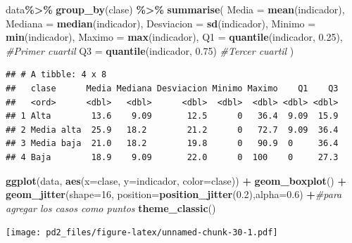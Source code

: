 \documentclass[
]{article}
\newenvironment{Shaded}{\begin{snugshade}}{\end{snugshade}}
\newcommand{\AttributeTok}[1]{\textcolor[rgb]{0.13,0.29,0.53}{#1}}
\newcommand{\CommentTok}[1]{\textcolor[rgb]{0.56,0.35,0.01}{\textit{#1}}}
\newcommand{\DecValTok}[1]{\textcolor[rgb]{0.00,0.00,0.81}{#1}}
\newcommand{\FloatTok}[1]{\textcolor[rgb]{0.00,0.00,0.81}{#1}}
\newcommand{\FunctionTok}[1]{\textcolor[rgb]{0.13,0.29,0.53}{\textbf{#1}}}
\newcommand{\NormalTok}[1]{#1}
\newcommand{\SpecialCharTok}[1]{\textcolor[rgb]{0.81,0.36,0.00}{\textbf{#1}}}
\begin{document}
\begin{Shaded}
\begin{Highlighting}[]
\NormalTok{data}\SpecialCharTok{\%\textgreater{}\%}
  \FunctionTok{group\_by}\NormalTok{(clase) }\SpecialCharTok{\%\textgreater{}\%}
  \FunctionTok{summarise}\NormalTok{(}
    \AttributeTok{Media =} \FunctionTok{mean}\NormalTok{(indicador), }
    \AttributeTok{Mediana =} \FunctionTok{median}\NormalTok{(indicador), }
    \AttributeTok{Desviacion =} \FunctionTok{sd}\NormalTok{(indicador), }
    \AttributeTok{Minimo =} \FunctionTok{min}\NormalTok{(indicador), }
    \AttributeTok{Maximo =} \FunctionTok{max}\NormalTok{(indicador),}
    \AttributeTok{Q1 =} \FunctionTok{quantile}\NormalTok{(indicador, }\FloatTok{0.25}\NormalTok{), }\CommentTok{\#Primer cuartil}
    \AttributeTok{Q3 =} \FunctionTok{quantile}\NormalTok{(indicador, }\FloatTok{0.75}\NormalTok{) }\CommentTok{\#Tercer cuartil}
\NormalTok{  )}
\end{Highlighting}
\end{Shaded}

\begin{verbatim}
## # A tibble: 4 x 8
##   clase      Media Mediana Desviacion Minimo Maximo    Q1    Q3
##   <ord>      <dbl>   <dbl>      <dbl>  <dbl>  <dbl> <dbl> <dbl>
## 1 Alta        13.6    9.09       12.5      0   36.4  9.09  15.9
## 2 Media alta  25.9   18.2        21.2      0   72.7  9.09  36.4
## 3 Media baja  21.0   18.2        19.8      0   90.9  0     36.4
## 4 Baja        18.9    9.09       22.0      0  100    0     27.3
\end{verbatim}

\begin{Shaded}
\begin{Highlighting}[]
\FunctionTok{ggplot}\NormalTok{(data, }\FunctionTok{aes}\NormalTok{(}\AttributeTok{x=}\NormalTok{clase, }\AttributeTok{y=}\NormalTok{indicador, }\AttributeTok{color=}\NormalTok{clase)) }\SpecialCharTok{+} 
  \FunctionTok{geom\_boxplot}\NormalTok{() }\SpecialCharTok{+} 
  \FunctionTok{geom\_jitter}\NormalTok{(}\AttributeTok{shape=}\DecValTok{16}\NormalTok{, }\AttributeTok{position=}\FunctionTok{position\_jitter}\NormalTok{(}\FloatTok{0.2}\NormalTok{),}\AttributeTok{alpha=}\FloatTok{0.6}\NormalTok{) }\SpecialCharTok{+}\CommentTok{\#para agregar los casos como puntos}
  \FunctionTok{theme\_classic}\NormalTok{()}
\end{Highlighting}
\end{Shaded}

\texttt{[image: pd2\_files/figure-latex/unnamed-chunk-30-1.pdf]}
\end{document}
